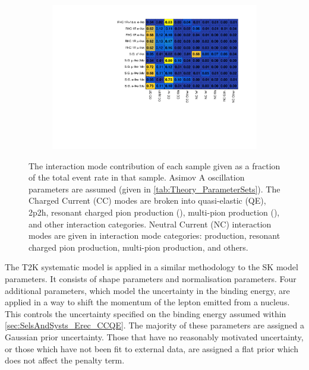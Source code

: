 \begin{figure}[h]
  \begin{subfigure}[t]{\textwidth}
    \includegraphics[width=\textwidth, trim={0mm 0mm 0mm 0mm}, clip,page=1]{Figures/Selections/FractionalModeComparison.pdf}
  \end{subfigure}
  \caption{The interaction mode contribution of each sample given as a fraction of the total event rate in that sample. Asimov A oscillation parameters are assumed (given in \autoref{tab:Theory_ParameterSets}). The Charged Current (CC) modes are broken into quasi-elastic (QE), 2p2h, resonant charged pion production (\quickmath{1\pi^{\pm}}), multi-pion production (), and other interaction categories. Neutral Current (NC) interaction modes are given in interaction mode categories:  production, resonant charged pion production,  multi-pion production, and others.}
  \label{fig:SelsAndSysts_FractionalModeComparison}
\end{figure}

The T2K systematic model \cite{t2k_tn_344} is applied in a similar methodology to the SK model parameters. It consists of  shape parameters and  normalisation parameters. Four additional parameters, which model the uncertainty in the binding energy, are applied in a way to shift the momentum of the lepton emitted from a nucleus. This controls the uncertainty specified on the  binding energy assumed within \autoref{sec:SelsAndSysts_Erec_CCQE}. The majority of these parameters are assigned a Gaussian prior uncertainty. Those that have no reasonably motivated uncertainty, or those which have not been fit to external data, are assigned a flat prior which does not affect the penalty term.

